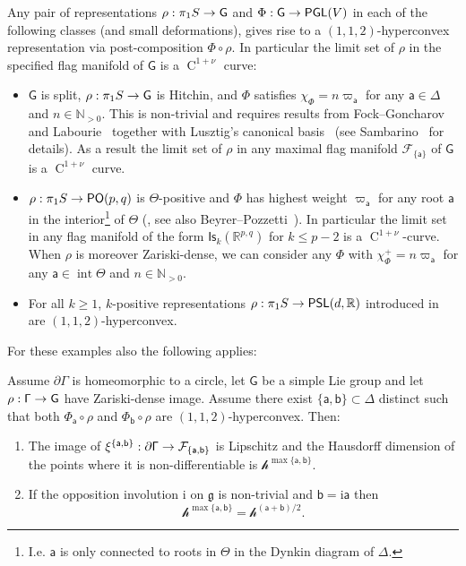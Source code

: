 \documentclass[AHL,Unicode,longabstracts,MathTools]{cedram}
\DeclareMathOperator{\class}{C}
\DeclareMathOperator{\inte}{int}
\newcommand{\ii}{\mathrm{i}}
\DeclareMathOperator{\PSL}{{\mathsf{PSL}}}
\DeclareMathOperator{\PGL}{{\mathsf{PGL}}}
\DeclareMathOperator{\PO}{{\mathsf{PO}}}
\newcommand{\scr}{\mathscr}
\newcommand{\hC}[1]{{\scr h}^{#1}}
\renewcommand{\sf}[1]{{\mathsf{#1}}}
\newcommand{\sroot}{{\sf{a}}}
\newcommand{\bb}{{\sf{b}}}
\newcommand{\sfG}{\sf{G}}
\newcommand{\G}{\sf{\Gamma}}
\newcommand{\calF}{\mathcal{F}}
\newcommand{\R}{\mathbb{R}}
\newcommand{\N}{\mathbb{N}}
\newcommand{\bord}{\partial}
\newcommand{\piS}{\pi_1S}
\newcommand{\simple}{{\sf \Delta}}
\newcommand{\Fund}{\Phi}
\newcommand{\peso}{\varpi}
\renewcommand{\/}{\backslash}
\newcommand{\<}{\langle}
\renewcommand{\>}{\rangle}
\renewcommand{\ge}{\mathfrak{g}}
\renewcommand*{\to}{\mathchoice{\longrightarrow}{\rightarrow}{\rightarrow}{\rightarrow}}
\begin{document}
\begin{exam}\label{ex.hyperconvex}
Any pair of representations $\rho:\pi_1S\to\sfG$ and $\Fund:\sfG\to\PGL(V)$ in each of the following classes (and small deformations), gives rise to a $(1,1,2)$-hyperconvex representation via post-composition $\Fund\circ\rho$. In particular the limit set of $\rho$ in the specified flag manifold of $\sfG$ is a $\class^{1+\nu}$ curve:
\begin{itemize}
\item $\sfG$ is split, $\rho:\piS\to\sfG$ is Hitchin, and $\Fund$ satisfies $\chi_\Fund=n\peso_\sroot$ for any $\sroot\in\simple$ and $n\in\N_{>0}$. This is non-trivial and requires results from Fock--Goncharov~\cite{FG} and Labourie~\cite{labourie} together with Lusztig's canonical basis~\cite[Proposition~3.2]{Lusztig-TP} (see Sambarino~\cite[Section~5.8]{clausurasPos} for details). As a result the limit set of $\rho$ in any maximal flag manifold $\calF_{\{\sroot\}}$ of $\sfG$ is a $\class^{1+\nu}$ curve.

\item $\rho:\piS\to\PO(p,q)$ is $\Theta$-positive and $\Fund$ has highest weight $\peso_\sroot$ for any root $\sroot$ in the interior\footnote{I.e. $\sroot$ is only connected to roots in $\Theta$ in the Dynkin diagram of $\simple$.} of $\Theta$ (\cite[Theorem~10.3]{PSW2}, see also Beyrer--Pozzetti~\cite[Remark~4.6]{BP}). In particular the limit set in any flag manifold of the form ${\sf{Is}}_k(\R^{p,q})$ for $k\leq p-2$ is a $\class^{1+\nu}$-curve. When $\rho$ is moreover Zariski-dense, we can consider any $\Fund$ with $\chi_\Fund^+=n\peso_\sroot$ for any $\sroot \in\inte\Theta$ and $n\in\N_{>0}$.
\item For all $k\geq 1$, $k$-positive representations $\rho:\piS\to\PSL(d,\R)$ introduced in~\cite{BeyP2} are $(1,1,2)$-hyperconvex.
\end{itemize}
\end{exam}



For these examples also the following applies:


\begin{coro}\label{cor.B}
Assume $\bord\G$ is homeomorphic to a circle, let $\sfG$ be a simple Lie group and let $\rho:\G\to\sfG$ have Zariski-dense image. Assume there exist $\{\sroot,\bb\}\subset\simple$ distinct such that both $\Fund_\sroot\circ\rho$ and $\Fund_\bb\circ\rho$ are $(1,1,2)$-hyperconvex. Then:
\begin{enumerate}
\item\label{coro1.9.1} The image of $\xi^{\{\sroot,\bb\}}:\bord\G\to\calF_{\{\sroot,\bb\}}$ is Lipschitz and the Hausdorff dimension of the points where it is non-differentiable is $\hC{\max\{\sroot,\bb\}}$.
\item\label{coro1.9.2} If the opposition involution $\ii$ on $\ge$ is non-trivial and $\bb=\ii\sroot$ then
\[
\hC{\max\{\sroot,\bb\}}=\hC{(\sroot+\bb)/2}.
\]
\end{enumerate}
\end{coro}
\end{document}
